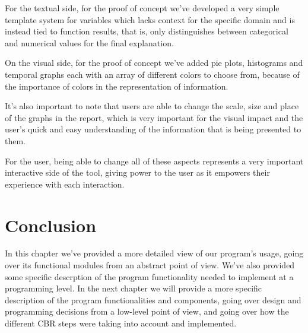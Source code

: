 For the textual side, for the proof of concept we've developed a very simple template system for variables which lacks context for the specific domain and is instead tied to function results, that is, only distinguishes between categorical and numerical values for the final explanation.

On the visual side, for the proof of concept we've added pie plots, histograms and temporal graphs each with an array of different colors to choose from, because of the importance of colors in the representation of information.

It's also important to note that users are able to change the scale, size and place of the graphs in the report, which is very important for the visual impact and the user's quick and easy understanding of the information that is being presented to them.

For the user, being able to change all of these aspects represents a very important interactive side of the tool, giving power to the user as it empowers their experience with each interaction.

\section{Conclusion}
In this chapter we've provided a more detailed view of our program's usage, going over its functional modules from an abstract point of view. 
We've also provided some specific descrption of the program functionality needed to implement at a programming level.
In the next chapter we will provide a more specific description of the program functionalities and components, going over design and programming decisions from a low-level point of view, and going over how the different CBR steps were taking into account and implemented.
\medskip
